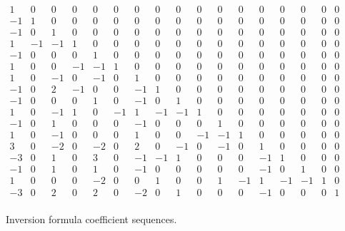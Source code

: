 \documentclass[12pt,reqno,a4letter]{article}
\numberwithin{figure}{section}
\numberwithin{table}{section}
\numberwithin{equation}{section}
\theoremstyle{plain}
\numberwithin{theorem}{section}
\theoremstyle{definition}
\begin{document}
\begin{figure}[ht!]

\begin{minipage}{\linewidth} 
\begin{center} 
\small
\begin{equation*} 
\boxed{ 
\begin{array}{ccccccccccccccccc}
 1 & 0 & 0 & 0 & 0 & 0 & 0 & 0 & 0 & 0 & 0 & 0 & 0 & 0 & 0 & 0 & 0 \\
 -1 & 1 & 0 & 0 & 0 & 0 & 0 & 0 & 0 & 0 & 0 & 0 & 0 & 0 & 0 & 0 & 0 \\
 -1 & 0 & 1 & 0 & 0 & 0 & 0 & 0 & 0 & 0 & 0 & 0 & 0 & 0 & 0 & 0 & 0 \\
 1 & -1 & -1 & 1 & 0 & 0 & 0 & 0 & 0 & 0 & 0 & 0 & 0 & 0 & 0 & 0 & 0 \\
 -1 & 0 & 0 & 0 & 1 & 0 & 0 & 0 & 0 & 0 & 0 & 0 & 0 & 0 & 0 & 0 & 0 \\
 1 & 0 & 0 & -1 & -1 & 1 & 0 & 0 & 0 & 0 & 0 & 0 & 0 & 0 & 0 & 0 & 0 \\
 1 & 0 & -1 & 0 & -1 & 0 & 1 & 0 & 0 & 0 & 0 & 0 & 0 & 0 & 0 & 0 & 0 \\
 -1 & 0 & 2 & -1 & 0 & 0 & -1 & 1 & 0 & 0 & 0 & 0 & 0 & 0 & 0 & 0 & 0 \\
 -1 & 0 & 0 & 0 & 1 & 0 & -1 & 0 & 1 & 0 & 0 & 0 & 0 & 0 & 0 & 0 & 0 \\
 1 & 0 & -1 & 1 & 0 & -1 & 1 & -1 & -1 & 1 & 0 & 0 & 0 & 0 & 0 & 0 & 0 \\
 -1 & 0 & 1 & 0 & 0 & 0 & -1 & 0 & 0 & 0 & 1 & 0 & 0 & 0 & 0 & 0 & 0 \\
 1 & 0 & -1 & 0 & 0 & 0 & 1 & 0 & 0 & -1 & -1 & 1 & 0 & 0 & 0 & 0 & 0 \\
 3 & 0 & -2 & 0 & -2 & 0 & 2 & 0 & -1 & 0 & -1 & 0 & 1 & 0 & 0 & 0 & 0 \\
 -3 & 0 & 1 & 0 & 3 & 0 & -1 & -1 & 1 & 0 & 0 & 0 & -1 & 1 & 0 & 0 & 0 \\
 -1 & 0 & 1 & 0 & 1 & 0 & -1 & 0 & 0 & 0 & 0 & 0 & -1 & 0 & 1 & 0 & 0 \\
 1 & 0 & 0 & 0 & -2 & 0 & 0 & 1 & 0 & 0 & 1 & -1 & 1 & -1 & -1 & 1 & 0 \\
 -3 & 0 & 2 & 0 & 2 & 0 & -2 & 0 & 1 & 0 & 0 & 0 & -1 & 0 & 0 & 0 & 1 \\
\end{array}
}
\end{equation*}
\end{center} 
\end{minipage} 

\caption[GCD sum inversion coefficients]{Inversion formula coefficient sequences.} 
\label{figure_munk_and_inv_seqs} 

\end{figure} 
\end{document}
